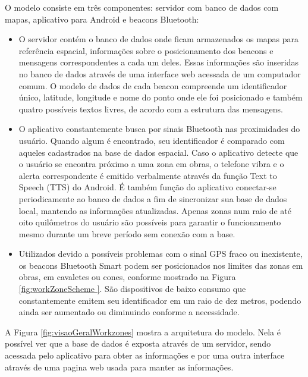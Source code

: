 \documentclass[english,brazilian]{UNISINOSmonografia}
\begin{document}
O modelo consiste em três componentes: servidor com banco de dados com mapas, aplicativo para Android e beacons Bluetooth:
\begin{itemize}
	\item O servidor contém o banco de dados onde ficam armazenados os mapas para referência espacial, informações sobre o posicionamento dos beacons e mensagens correspondentes a cada um deles. Essas informações são inseridas no banco de dados através de uma interface web acessada de um computador comum. O modelo de dados de cada beacon compreende um identificador único, latitude, longitude e nome do ponto onde ele foi posicionado e também quatro possíveis textos livres, de acordo com a estrutura das mensagens.

	\item O aplicativo constantemente busca por sinais Bluetooth nas proximidades do usuário. Quando algum é encontrado, seu identificador é comparado com aqueles cadastrados na base de dados espacial. Caso o aplicativo detecte que o usuário se encontra próximo a uma zona em obras, o telefone vibra e o alerta correspondente é emitido verbalmente através da função Text to Speech (TTS) do Android. É também função do aplicativo conectar-se periodicamente ao banco de dados a fim de sincronizar sua base de dados local, mantendo as informações atualizadas. Apenas zonas num raio de até oito quilômetros do usuário são possíveis para garantir o funcionamento mesmo durante um breve período sem conexão com a base.
	
	\item Utilizados devido a possíveis problemas com o sinal GPS fraco ou inexistente, os beacons Bluetooth Smart podem ser posicionados nos limites das zonas em obras, em cavaletes ou cones, conforme mostrado na Figura \ref{fig:workZoneScheme }. São dispositivos de baixo consumo que constantemente emitem seu identificador em um raio de dez metros, podendo ainda ser aumentado ou diminuindo conforme a necessidade.
\end{itemize}

A Figura \ref{fig:visaoGeralWorkzones} mostra a arquitetura do modelo. Nela é possível ver que a base de dados é exposta através de um servidor, sendo acessada pelo aplicativo para obter as informações e por uma outra interface através de uma pagina web usada para manter as informações.
\end{document}

